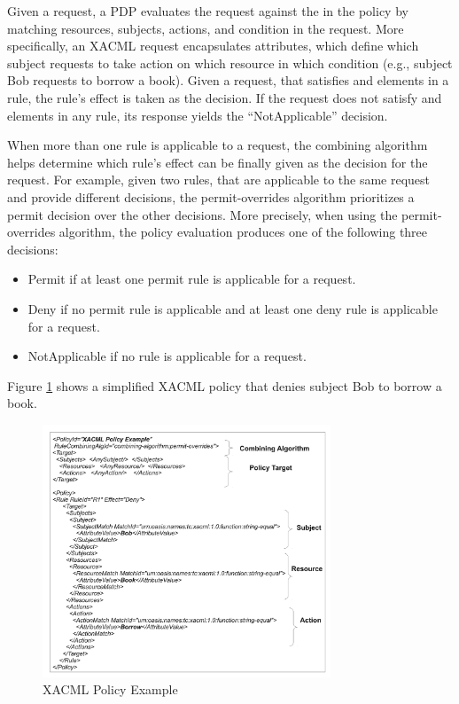Given a request, a PDP evaluates the request against the  in the policy by matching resources, subjects, actions, and condition in the request.
More specifically, an XACML request encapsulates attributes, which define which subject requests to take action on which resource in which
condition (e.g., subject Bob requests to borrow a book).
Given a request, that satisfies  and  elements in a rule, the rule's effect
is taken as the decision.
If the request does not satisfy  and  elements in any rule, its response yields the ``NotApplicable'' decision.

When more than one rule is applicable to a request, the combining algorithm helps determine which rule's effect can be finally given as the decision for the request.
For example, given two rules, that are applicable to the same request and provide different decisions,
the permit-overrides algorithm prioritizes a permit decision over the other decisions.
More precisely, when using the permit-overrides algorithm, the policy evaluation produces one of the following three decisions: 

\begin{itemize}
\item Permit if at least one permit rule is applicable for a request.
\item Deny if no permit rule is applicable and at least one deny rule is applicable for a request.
\item NotApplicable if no rule is applicable for a request.
\end{itemize}

Figure \ref{figur1} shows a simplified XACML policy that denies subject Bob to borrow a book.

\begin{figure}[!h]
\begin{center}
\includegraphics[width=8.6cm]{xacml}
\caption{XACML Policy Example}
\label{figur1}
\end{center}
\end{figure}

